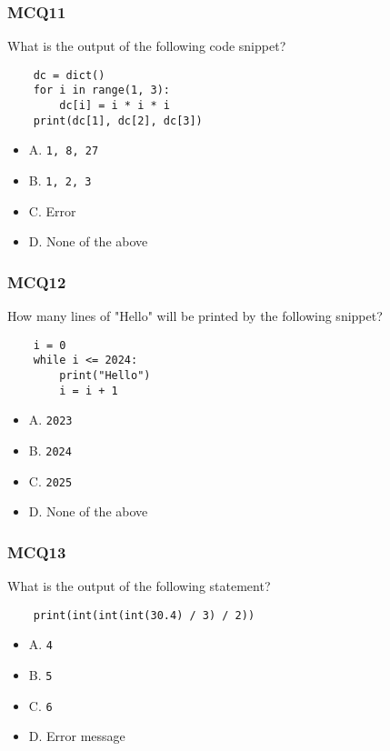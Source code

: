 \documentclass{beamer}
\begin{document}
\begin{frame}[fragile]
    \frametitle{MCQ11}
    What is the output of the following code snippet?
    \begin{verbatim}
    dc = dict()
    for i in range(1, 3):
        dc[i] = i * i * i
    print(dc[1], dc[2], dc[3])
    \end{verbatim}
    \begin{itemize}
        \item A. \texttt{1, 8, 27}
        \item B. \texttt{1, 2, 3}
        \item C. Error
        \item D. None of the above
    \end{itemize}
\end{frame}

\begin{frame}[fragile]
    \frametitle{MCQ12}
    How many lines of "Hello" will be printed by the following snippet?
    \begin{verbatim}
    i = 0
    while i <= 2024:
        print("Hello")
        i = i + 1
    \end{verbatim}
    \begin{itemize}
        \item A. \texttt{2023}
        \item B. \texttt{2024}
        \item C. \texttt{2025}
        \item D. None of the above
    \end{itemize}
\end{frame}

\begin{frame}[fragile]
    \frametitle{MCQ13}
    What is the output of the following statement?
    \begin{verbatim}
    print(int(int(int(30.4) / 3) / 2))
    \end{verbatim}
    \begin{itemize}
        \item A. \texttt{4}
        \item B. \texttt{5}
        \item C. \texttt{6}
        \item D. Error message
    \end{itemize}
\end{frame}
\end{document}
